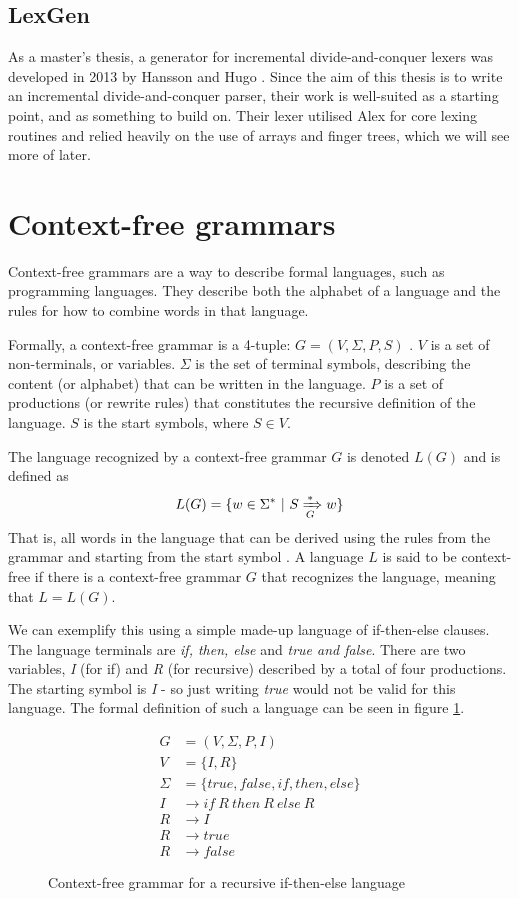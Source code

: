 \documentclass[a4paper,12pt,twosided]{report}
\begin{document}
\subsection{LexGen}
As a master's thesis, a generator for incremental divide-and-conquer lexers was
developed in 2013 by Hansson and Hugo \cite{divconqlex}. Since the aim of this
thesis is to write an incremental divide-and-conquer parser, their work is
well-suited as a starting point, and as something to build on. Their lexer
utilised Alex for core lexing routines and relied heavily on the use of arrays
and finger trees, which we will see more of later. 

\section{Context-free grammars}
Context-free grammars are a way to describe formal languages, such as
programming languages. They describe both the alphabet of a language and the
rules for how to combine words in that language.

Formally, a context-free grammar is a 4-tuple: $G = (V, \Sigma, P, S)$
\cite[p.171]{automatabook}. $V$ is a set of non-terminals, or variables. $\Sigma$ is
the set of terminal symbols, describing the content (or alphabet) that can be
written in the language.  $P$ is a set of productions (or rewrite rules) that
constitutes the recursive definition of the language. $S$ is the start symbols,
where $S \in V$. 

The language recognized by a context-free grammar $G$ is denoted $L(G)$ and is
defined as 
\[
L(G) = \{w \in \Sigma^* \ |\  S \xRightarrow[G]{*} w\}
\]
That is, all words in the language that can be derived using the rules from the
grammar and starting from the start symbol \cite[p. 177]{automatabook}.  A
language $L$ is said to be context-free if there is a context-free grammar $G$
that recognizes the language, meaning that $L = L(G)$.

We can exemplify this using a simple made-up language of if-then-else clauses.
The language terminals are \textit{if, then, else} and \textit{true and false}.
There are two variables, \textit{I} (for if) and \textit{R} (for recursive)
described by a total of four productions. The starting symbol is \textit{I} - so
just writing \textit{true} would not be valid for this language. The formal
definition of such a language can be seen in figure \ref{iflang}.

\begin{figure}[H]
\begin{align*}
G &= (V, \Sigma , P, I) \\
V &= \{I,R\} \\
\Sigma &= \{true,false,if,then,else\} \\
I &\rightarrow if\ R\ then\ R\ else\ R \\
R &\rightarrow I \\
R &\rightarrow true \\
R &\rightarrow false
\end{align*}
\caption{Context-free grammar for a recursive if-then-else language}
\label{iflang}
\end{figure}
\end{document}
